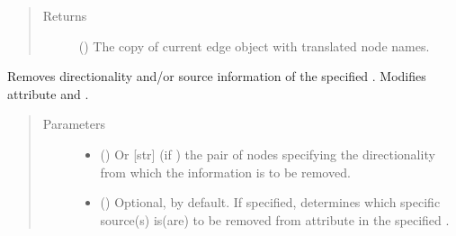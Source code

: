\documentclass[letterpaper,10pt,english]{sphinxmanual}
\begin{document}
\begin{fulllineitems}
\begin{fulllineitems}
\begin{quote}
\begin{description}
\item[{Returns}] \leavevmode
() \textendash{} The copy of current edge object
with translated node names.

\end{description}\end{quote}

\end{fulllineitems}


\begin{fulllineitems}
\label{\detokenize{reference:pypath.main.Direction.unset_dir}}
Removes directionality and/or source information of the
specified . Modifies attribute  and
.
\begin{quote}\begin{description}
\item[{Parameters}] \leavevmode\begin{itemize}
\item {} 
 () \textendash{} Or {[}str{]} (if ) the pair of nodes specifying
the directionality from which the information is to be
removed.

\item {} 
 () \textendash{} Optional,  by default. If specified, determines
which specific source(s) is(are) to be removed from
 attribute in the specified .

\end{itemize}

\end{description}\end{quote}

\end{fulllineitems}



\end{fulllineitems}
\end{document}
